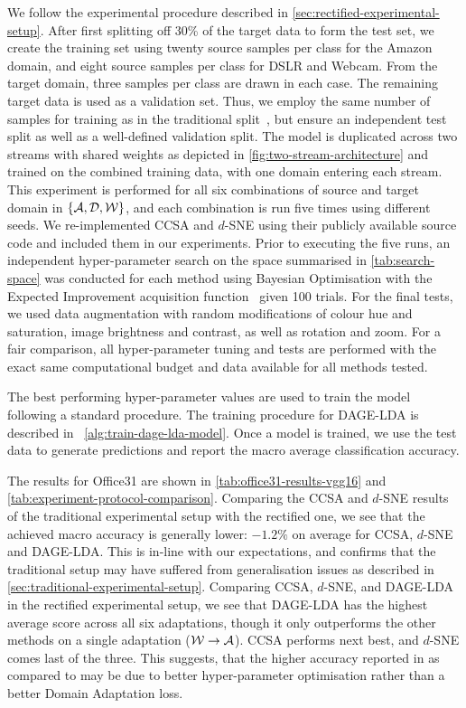 \documentclass[journal]{IEEEtran}
\begin{document}
We follow the experimental procedure described in \cref{sec:rectified-experimental-setup}. After first splitting off 30\% of the target data to form the test set, we create the training set using twenty source samples per class for the Amazon domain, and eight source samples per class for DSLR and Webcam. From the target domain, three samples per class are drawn in each case. The remaining target data is used as a validation set.
Thus, we employ the same number of samples for training as in the traditional split~\cite{tzeng2015simultaneous, xu2019dsne, motiian2017ccsa}, but ensure an independent test split as well as a well-defined validation split.
The model is duplicated across two streams with shared weights as depicted in \cref{fig:two-stream-architecture} and trained on the combined training data, with one domain entering each stream.
This experiment is performed for all six combinations of source and target domain in $\{\concept{A}, \concept{D}, \concept{W}\}$, and each combination is run five times using different seeds.
We re-implemented CCSA and $d$-SNE using their publicly available source code and included them in our experiments. Prior to executing the five runs, an independent hyper-parameter search on the space summarised in \cref{tab:search-space} was conducted for each method using Bayesian Optimisation with the Expected Improvement acquisition function~\cite{brochu2010} given 100 trials. For the final tests, we used data augmentation with random modifications of colour hue and saturation, image brightness and contrast, as well as rotation and zoom. For a fair comparison, all hyper-parameter tuning and tests are performed with the exact same computational budget and data available for all methods tested. 

The best performing hyper-parameter values are used to train the model following a standard procedure. The training procedure for DAGE-LDA is described in ~\cref{alg:train-dage-lda-model}. Once a model is trained, we use the test data to generate predictions and report the macro average classification accuracy. 

The results for Office31 are shown in \cref{tab:office31-results-vgg16} and \cref{tab:experiment-protocol-comparison}. 
Comparing the CCSA and $d$-SNE results of the traditional experimental setup with the rectified one, we see that the achieved macro accuracy is generally lower: $-1.2\%$ on average for CCSA, $d$-SNE and DAGE-LDA. This is in-line with our expectations, and confirms that the traditional setup may have suffered from generalisation issues as described in \cref{sec:traditional-experimental-setup}. Comparing CCSA, $d$-SNE, and DAGE-LDA in the rectified experimental setup, we see that DAGE-LDA has the highest average score across all six adaptations, though it only outperforms the other methods on a single adaptation ($\concept{W} \rightarrow \concept{A}$). CCSA performs next best, and $d$-SNE comes last of the three. This suggests, that the higher accuracy reported in \cite{xu2019dsne} as compared to \cite{motiian2017ccsa} may be due to better hyper-parameter optimisation rather than a better Domain Adaptation loss.
\end{document}
